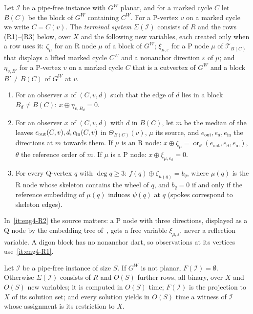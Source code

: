Let $\mathcal I$ be a pipe-free instance with $G^W$ planar, and for a marked
cycle $C$ let $B(C)$ be the block of $G^W$ containing $C^W$. For a P-vertex
$v$ on a marked cycle we write $C=C(v)$. The \emph{terminal system}
$\Sigma(\mathcal I)$ consists of $R$ and the rows (R1)--(R3) below, over $X$
and the following new variables, each created only when a row uses it:
$\zeta_\mu$ for an R node $\mu$ of a block of $G^W$; $\xi_{\mu,\varepsilon}$
for a P node $\mu$ of $\mathcal T_{B(C)}$ that displays a lifted marked cycle
$C^W$ and a nonanchor direction $\varepsilon$ of $\mu$; and $\eta_{v,B'}$ for
a P-vertex $v$ on a marked cycle $C$ that is a cutvertex of $G^W$ and a block
$B'\ne B(C)$ of $G^W$ at $v$.
\begin{enumerate}[label=(R\arabic*),nosep]
\item\label{it:eng4-R1} For an observer $x$ of $(C,v,d)$ such that the edge
  of $d$ lies in a block $B_d\ne B(C)$: $x\oplus\eta_{v,B_d}=0$.
\item\label{it:eng4-R2} For an observer $x$ of $(C,v,d)$ with $d$ in $B(C)$,
  let $m$ be the median of the leaves $c_{\mathrm{out}}(C,v),d,c_{\mathrm{in}}(C,v)$ in
  $\Theta_{B(C)}(v)$, $\mu$ its source, and $e_{\mathrm{out}},e_d,
  e_{\mathrm{in}}$ the directions at $m$ towards them. If $\mu$ is an R node:
  $x\oplus\zeta_\mu=\operatorname{or}_{\theta}(e_{\mathrm{out}},e_d,
  e_{\mathrm{in}})$, $\theta$ the reference order of $m$. If $\mu$ is a P
  node: $x\oplus\xi_{\mu,e_d}=0$.
\item\label{it:eng4-R3} For every Q-vertex $q$ with $\deg q\ge3$:
  $f(q)\oplus\zeta_{\mu(q)}=b_q$, where $\mu(q)$ is the R node whose skeleton
  contains the wheel of $q$, and $b_q=0$ if and only if the reference
  embedding of $\mu(q)$ induces $\psi(q)$ at $q$ (spokes correspond to
  skeleton edges).
\end{enumerate}
In~\ref{it:eng4-R2} the source matters: a P node with three directions,
displayed as a Q node by the embedding tree of~\cite{BFR21}, gets a free
variable $\xi_{\mu,\varepsilon}$, never a reflection variable. A digon block
has no nonanchor dart, so observations at its vertices use~\ref{it:eng4-R1}.

\begin{theorem}\label{thm:eng4-terminal}
Let $\mathcal I$ be a pipe-free instance of size $S$. If $G^W$ is not
planar, $F(\mathcal I)=\emptyset$. Otherwise $\Sigma(\mathcal I)$ consists of
$R$ and $O(S)$ further rows, all binary, over $X$ and $O(S)$ new variables;
it is computed in $O(S)$ time; $F(\mathcal I)$ is the projection to $X$ of
its solution set; and every solution yields in $O(S)$ time a witness of
$\mathcal I$ whose assignment is its restriction to $X$.
\end{theorem}


